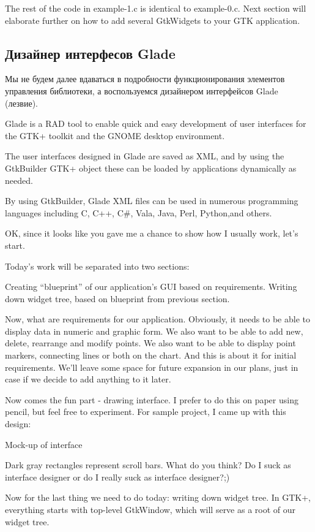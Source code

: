 \documentclass[a4paper,openany,twoside,draft]{book}
\begin{document}
The rest of the code in example-1.c is identical to example-0.c. Next section will elaborate further on how to add several GtkWidgets to your GTK application.

\subsection{Дизайнер интерфесов Glade}
\label{sec:glade}

Мы не будем далее вдаваться в подробности функционирования элементов управления библиотеки, а воспользуемся дизайнером интерфейсов Glade (лезвие).

Glade is a RAD tool to enable quick and easy development of user interfaces for the GTK+ toolkit and the GNOME desktop environment.

The user interfaces designed in Glade are saved as XML, and by using the GtkBuilder GTK+ object these can be loaded by applications dynamically as needed.

By using GtkBuilder, Glade XML files can be used in numerous programming languages including C, C++, C\#, Vala, Java, Perl, Python,and others.

OK, since it looks like you gave me a chance to show how I usually work, let's start.

Today's work will be separated into two sections:

    Creating ``blueprint'' of our application's GUI based on requirements.
    Writing down widget tree, based on blueprint from previous section.

Now, what are requirements for our application. Obviously, it needs to be able to display data in numeric and graphic form. We also want to be able to add new, delete, rearrange and modify points. We also want to be able to display point markers, connecting lines or both on the chart. And this is about it for initial requirements. We'll leave some space for future expansion in our plans, just in case if we decide to add anything to it later.

Now comes the fun part - drawing interface. I prefer to do this on paper using pencil, but feel free to experiment. For sample project, I came up with this design:

Mock-up of interface

Dark gray rectangles represent scroll bars. What do you think? Do I suck as interface designer or do I really suck as interface designer?;)

Now for the last thing we need to do today: writing down widget tree. In GTK+, everything starts with top-level GtkWindow, which will serve as a root of our widget tree.
\end{document}
